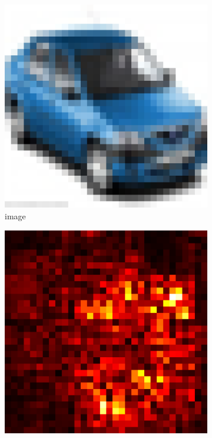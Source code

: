 \documentclass[preprint,12pt]{elsarticle}
\begin{document}
\begin{figure}
    \centering
    \begin{subfigure}{0.14\linewidth}
        \centering
        \includegraphics[width=\linewidth]{../visualizations/examples/cifar10/cnn/images/1.png}
        \caption{image}
    \end{subfigure}
    \hfill
    \begin{subfigure}{0.14\linewidth}
        \centering
        \includegraphics[width=\linewidth]{../visualizations/examples/cifar10/cnn/saliency_map/1.png}

\end{subfigure}
\end{figure}
\end{document}
